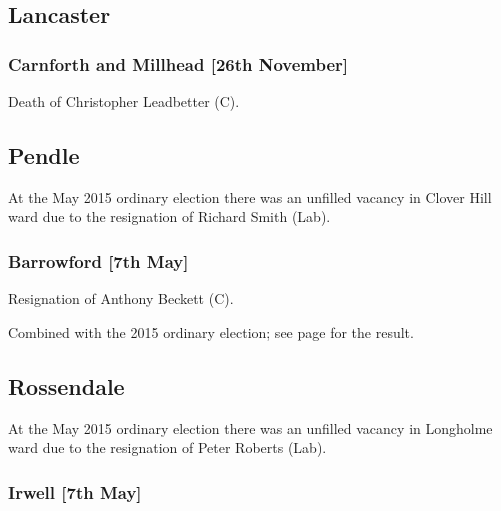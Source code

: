 \documentclass[a4paper,openany]{book}
\begin{document}
\begin{resultsiii}
\subsection*{Lancaster}

\subsubsection*{Carnforth and Millhead \hspace*{\fill}\nolinebreak[1]%
\enspace\hspace*{\fill}
[26th November]}


Death of Christopher Leadbetter (C).

\subsection*{Pendle}

At the May 2015 ordinary election there was an unfilled vacancy in Clover Hill ward due to the resignation of Richard Smith (Lab).

\subsubsection*{Barrowford \hspace*{\fill}\nolinebreak[1]%
\enspace\hspace*{\fill}
[7th May]}


Resignation of Anthony Beckett (C).

Combined with the 2015 ordinary election; see page \pageref{BarrowfordPendle} for the result.

\subsection*{Rossendale}

At the May 2015 ordinary election there was an unfilled vacancy in Longholme ward due to the resignation of Peter Roberts (Lab).

\subsubsection*{Irwell \hspace*{\fill}\nolinebreak[1]%
\enspace\hspace*{\fill}
[7th May]}


\end{resultsiii}
\end{document}

